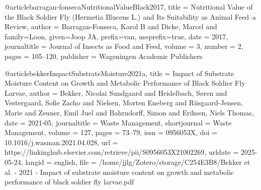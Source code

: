 {{{@article{barragan-fonsecaNutritionalValueBlack2017,
  title = {Nutritional Value of the Black Soldier Fly ({{Hermetia}} Illucens {{L}}.) and Its Suitability as Animal Feed–a Review},
  author = {Barragan-Fonseca, Karol B and Dicke, Marcel and family=Loon, given=Joop JA, prefix=van, useprefix=true},
  date = {2017},
  journaltitle = {Journal of Insects as Food and Feed},
  volume = {3},
  number = {2},
  pages = {105--120},
  publisher = {Wageningen Academic Publishers}
}

@article{bekkerImpactSubstrateMoisture2021a,
  title = {Impact of Substrate Moisture Content on Growth and Metabolic Performance of Black Soldier Fly Larvae},
  author = {Bekker, Nicolai Sundgaard and Heidelbach, Søren and Vestergaard, Sofie Zacho and Nielsen, Morten Eneberg and Riisgaard-Jensen, Marie and Zeuner, Emil Juel and Bahrndorff, Simon and Eriksen, Niels Thomas},
  date = {2021-05},
  journaltitle = {Waste Management},
  shortjournal = {Waste Management},
  volume = {127},
  pages = {73--79},
  issn = {0956053X},
  doi = {10.1016/j.wasman.2021.04.028},
  url = {https://linkinghub.elsevier.com/retrieve/pii/S0956053X21002269},
  urldate = {2025-05-24},
  langid = {english},
  file = {/home/jjlg/Zotero/storage/C254E3B8/Bekker et al. - 2021 - Impact of substrate moisture content on growth and metabolic performance of black soldier fly larvae.pdf}
}

}}}
